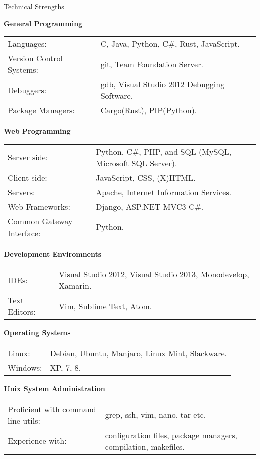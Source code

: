 \documentclass{resume} %
\newcommand{\btab}[2]{
	\bgroup
	\def\arraystretch{#1}
	\begin{tabular}{#2}
}
\newcommand{\etab}{
	\end{tabular} \smallskip
	\egroup
}
\begin{document}
\begin{rSection}{Technical Strengths}

{\bf General Programming}

\btab{1.1}{ l l }
	Languages: & C, Java, Python, C\#, Rust, JavaScript. \\
	Version Control Systems: & git, Team Foundation Server. \\
	Debuggers: & gdb, Visual Studio 2012 Debugging Software. \\
	Package Managers: & Cargo(Rust), PIP(Python). \\
\etab

{\bf Web Programming}

\btab{1.1}{ l l }
	Server side: & Python, C\#, PHP, and SQL (MySQL, Microsoft SQL Server). \\
	Client side: & JavaScript, CSS, (X)HTML. \\
	Servers: & Apache, Internet Information Services. \\
	Web Frameworks: & Django, ASP.NET MVC3 C\#. \\
	Common Gateway Interface: & Python. \\
\etab

{\bf Development Enviromnents}

\btab{1.1}{ l l }
    IDEs: & Visual Studio 2012, Visual Studio 2013, Monodevelop, Xamarin. \\
	Text Editors: & Vim, Sublime Text, Atom. \\
\etab

{\bf Operating Systems}

\btab{1.1}{ l l }
	Linux: & Debian, Ubuntu, Manjaro, Linux Mint, Slackware. \\
	Windows: & XP, 7, 8. \\
\etab

{\bf Unix System Administration}

\btab{1.1}{ l l }
	Proficient with command line utils: & grep, ssh, vim, nano, tar etc. \\
	Experience with: & configuration files, package managers, compilation, makefiles. \\
\etab

\end{rSection}
\end{document}
